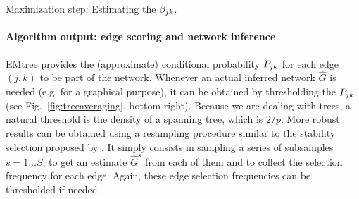 \begin{description}
\item[Maximization step: Estimating the $\beta_{jk}$.] 
\end{description}


\paragraph{Algorithm output: edge scoring and network inference} 
EMtree provides the (approximate) conditional probability $P_{jk}$ for each edge $(j, k)$ to be part of the network. 
Whenever an actual inferred network $\widehat{G}$ is needed (e.g. for a graphical purpose), it can be obtained by thresholding the $P_{jk}$ (see Fig.~\ref{fig:treeaveraging}, bottom right). Because we are dealing with trees, a natural threshold is the density of a spanning tree, which is  $2/p$.
More robust results can be obtained using a resampling procedure similar to the stability selection proposed by \citet{LRW10}. It simply consists in sampling a series of subsamples $s = 1 \dots S$, to get an estimate $\widehat{G}^s$ from each of them and to collect the selection frequency for each edge. Again, these edge selection frequencies can be thresholded if needed.